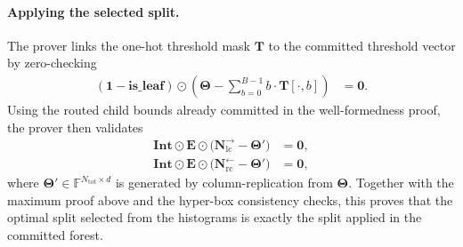 \paragraph{Applying the selected split.}
The prover links the one-hot threshold mask $\mathbf{T}$ to the committed threshold vector 
by zero-checking
\begin{align}
    (\mathbf{1}-\mathbf{is\_leaf})\odot
    \left(
    \boldsymbol{\Theta}
    -
    \sum_{b=0}^{B-1} b\cdot\mathbf{T}[\cdot,b]
    \right)
    &=\mathbf{0}.
\end{align}
Using the routed child bounds already committed in the well-formedness proof,
the prover then validates
\begin{align}
    \mathbf{Int}\odot\mathbf{E}\odot
    \bigl(\mathbf{N}^{\rightarrow}_{\mathrm{lc}}-\boldsymbol{\Theta}'\bigr)
    &=\mathbf{0},\\
    \mathbf{Int}\odot\mathbf{E}\odot
    \bigl(\mathbf{N}^{\leftarrow}_{\mathrm{rc}}-\boldsymbol{\Theta}'\bigr)
    &=\mathbf{0},
\end{align}
where $\boldsymbol{\Theta}'\in\mathbb{F}^{N_{\mathrm{tot}}\times d}$ is
generated by column-replication from $\boldsymbol{\Theta}$.
Together with the maximum proof above and the hyper-box consistency checks,
this proves that the optimal split selected from the histograms is exactly the
split applied in the committed forest.

